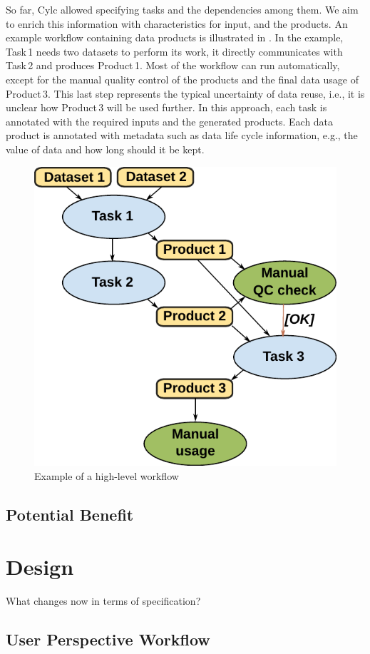 \documentclass[a4paper]{article}
\begin{document}
So far, Cylc allowed specifying tasks and the dependencies among them.
We aim to enrich this information with characteristics for input, and the products. {\color{cyan}{What?!}}
An example workflow containing data products is illustrated in .
\sout{{\color{blue}{Arrows indicate dependencies between nodes that represent tasks and data.}}}
{\color{cyan}{Nodes represent tasks and data and arrows indicate dependencies among tasks.}}
In the example, Task\,1 needs two datasets to perform its work, it directly communicates with Task\,2 and produces Product\,1.
Most of the workflow can run automatically, except for the manual quality control of the products and the final data usage of Product\,3.
This last step represents the typical uncertainty of data reuse, i.e., it is unclear how Product\,3 will be used further.
In this approach, each task is annotated with the required inputs and the generated products.
Each data product is annotated with metadata such as data life cycle information, e.g., the value of data and how long should it be kept.

\begin{figure}[H]
  \centering
  \includegraphics[width=0.4\columnwidth]{workflow}
  \caption{Example of a high-level workflow}
  \label{fig:workflow}
\end{figure}


\subsection{Potential Benefit}



\section{Design}
What changes now in terms of specification?

\subsection{User Perspective Workflow}
\end{document}
